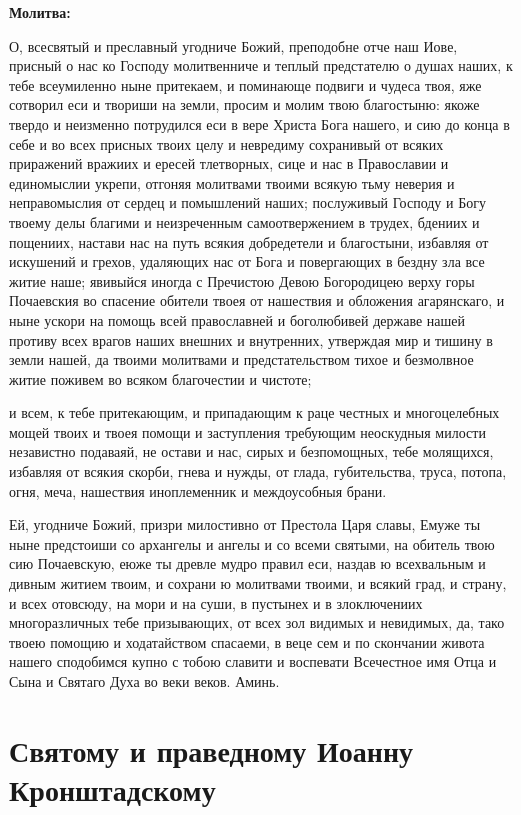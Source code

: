 \medskip


\bfseries Молитва:\normalfont{}\nopagebreak


О, всесвятый и преславный угодниче Божий, преподобне отче наш Иове, присный о нас ко Господу молитвенниче и теплый предстателю о душах наших, к тебе всеумиленно ныне притекаем, и поминающе подвиги и чудеса твоя, яже сотворил еси и твориши на земли, просим и молим твою благостыню: якоже твердо и неизменно потрудился еси в вере Христа Бога нашего, и сию до конца в себе и во всех присных твоих целу и невредиму сохранивый от всяких приражений вражиих и ересей тлетворных, сице и нас в Православии и единомыслии укрепи, отгоняя молитвами твоими всякую тьму неверия и неправомыслия от сердец и помышлений наших; послуживый Господу и Богу твоему делы благими и неизреченным самоотвержением в трудех, бдениих и пощениих, настави нас на путь всякия добредетели и благостыни, избавляя от искушений и грехов, удаляющих нас от Бога и повергающих в бездну зла все житие наше; явивыйся иногда с Пречистою Девою Богородицею верху горы Почаевския во спасение обители твоея от нашествия и обложения агарянскаго, и ныне ускори на помощь всей православней и боголюбивей державе нашей противу всех врагов наших внешних и внутренних, утверждая мир и тишину в земли нашей, да твоими молитвами и предстательством тихое и безмолвное житие поживем во всяком благочестии и чистоте; 

и всем, к тебе притекающим, и припадающим к раце честных и многоцелебных мощей твоих и твоея помощи и заступления требующим неоскудныя милости независтно подаваяй, не остави и нас, сирых и безпомощных, тебе молящихся, избавляя от всякия скорби, гнева и нужды, от глада, губительства, труса, потопа, огня, меча, нашествия иноплеменник и междоусобныя брани. 

Ей, угодниче Божий, призри милостивно от Престола Царя славы, Емуже ты ныне предстоиши со архангелы и ангелы и со всеми святыми, на обитель твою сию Почаевскую, еюже ты древле мудро правил еси, наздав ю всехвальным и дивным житием твоим, и сохрани ю молитвами твоими, и всякий град, и страну, и всех отовсюду, на мори и на суши, в пустынех и в злоключениих многоразличных тебе призывающих, от всех зол видимых и невидимых, да, тако твоею помощию и ходатайством спасаеми, в веце сем и по скончании живота нашего сподобимся купно с тобою славити и воспевати Всечестное имя Отца и Сына и Святаго Духа во веки веков. Аминь.


\section{Святому и праведному Иоанну Кронштадскому}
 


